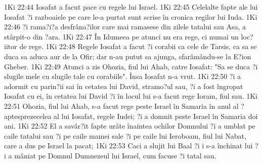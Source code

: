 1Ki 22:44  Iosafat a facut pace cu regele lui Israel.
1Ki 22:45  Celelalte fapte ale lui Iosafat ?i razboaiele pe care le-a purtat sunt scrise în cronica regilor lui Iuda.
1Ki 22:46  ?i rama?i?a desfrâna?ilor care mai ramasese din zilele tatalui sau Asa, a stârpit-o din ?ara.
1Ki 22:47  În Idumeea pe atunci nu era rege, ci numai un loc?iitor de rege.
1Ki 22:48  Regele Iosafat a facut ?i corabii ca cele de Tarsis, ca sa se duca sa aduca aur de la Ofir; dar n-au putut sa ajunga, sfarâmându-se la E?ion Gheber.
1Ki 22:49  Atunci a zis Ohozia, fiul lui Ahab, catre Iosafat: "Sa se duca ?i slugile mele cu slugile tale cu corabiile". Însa Iosafat n-a vrut.
1Ki 22:50  ?i a adormit cu parin?ii sai în cetatea lui David, stramo?ul sau, ?i a fost îngropat Iosafat cu ei, în cetatea lui David ?i în locul lui s-a facut rege Ioram, fiul sau.
1Ki 22:51  Ohozia, fiul lui Ahab, s-a facut rege peste Israel în Samaria în anul al ?aptesprezecelea al lui Iosafat, regele Iudei; ?i a domnit peste Israel în Samaria doi ani.
1Ki 22:52  El a savâr?it fapte urâte înaintea ochilor Domnului ?i a umblat pe caile tatalui sau ?i pe caile mamei sale ?i pe caile lui Ieroboam, fiul lui Nabat, care a dus pe Israel la pacat;
1Ki 22:53  Caci a slujit lui Baal ?i i s-a închinat lui ?i a mâniat pe Domnul Dumnezeul lui Israel, cum facuse ?i tatal sau.


